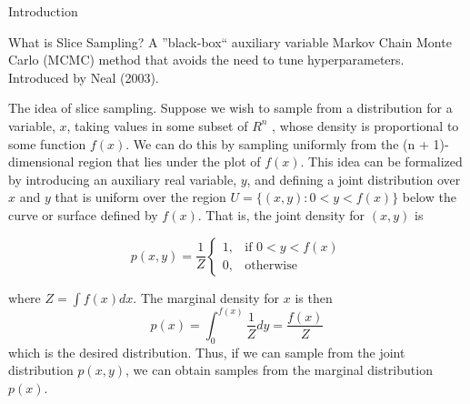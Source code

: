 \documentclass[aspectratio=169]{beamer}
\begin{document}
\begin{frame}{Introduction}

	\begin{block}{What is Slice Sampling?}
		A ''black-box`` auxiliary variable Markov Chain Monte Carlo (MCMC) method that
		avoids the need to tune hyperparameters. Introduced by Neal (2003).
	\end{block}

	The idea of slice sampling. Suppose we wish to sample from a distribution for a 
	variable, $x$, taking values in some subset of $R^n$ , whose density is proportional 
	to some function $f (x)$. We can do this by sampling uniformly from the
	(n + 1)-dimensional region that lies under the plot of $f (x)$. This idea can be 
	formalized by introducing an auxiliary real variable, $y$, and deﬁning a joint 
	distribution over $x$ and $y$ that is uniform over the region
	 $U = \{ (x,y):0 < y < f (x) \}$ below the curve or surface deﬁned
	  by $f (x)$. That is, the joint density for $(x,y)$ is

	\begin{equation*}
	p(x,y) = \frac{1}{Z} \begin{cases}
		1, & \text{if } 0 < y < f(x) \\
		0, & \text{otherwise}
		\end{cases}
	\end{equation*}  

	where $Z = \int f(x)dx$. The marginal density for $x$ is then 
	\begin{equation*}
	p(x) = \int_0^{f(x)} \frac{1}{Z} dy = \frac{f(x)}{Z}
	\end{equation*}
	which is the desired distribution. Thus, if we can sample from the joint 
	distribution $p(x,y)$, we can obtain samples from the marginal distribution $p(x)$.


\end{frame}
\end{document}
